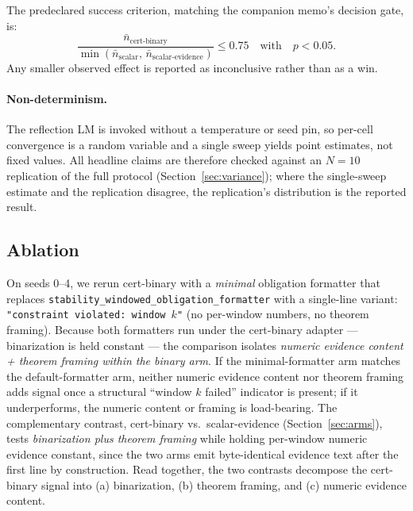 The predeclared success criterion, matching the companion memo's
decision gate, is:
\[
\frac{\bar n_{\text{cert-binary}}}{\min(\bar n_{\text{scalar}},\, \bar n_{\text{scalar-evidence}})} \le 0.75
\quad\text{with}\quad p < 0.05.
\]
Any smaller observed effect is reported as inconclusive rather than
as a win.

\paragraph{Non-determinism.}  The reflection LM is invoked without a
temperature or seed pin, so per-cell convergence is a random
variable and a single sweep yields point estimates, not fixed
values.  All headline claims are therefore checked against an $N=10$
replication of the full protocol
(Section~\ref{sec:variance}); where the single-sweep estimate and
the replication disagree, the replication's distribution is the
reported result.

\subsection{Ablation}\label{sec:ablation}

On seeds 0--4, we rerun cert-binary with a \emph{minimal} obligation
formatter that replaces
\texttt{stability\_windowed\_obligation\_formatter} with a
single-line variant: \texttt{"constraint violated: window $k$"} (no
per-window numbers, no theorem framing).  Because both formatters
run under the cert-binary adapter --- binarization is held constant
--- the comparison isolates \emph{numeric evidence content +
theorem framing within the binary arm}.  If the minimal-formatter
arm matches the default-formatter arm, neither numeric evidence
content nor theorem framing adds signal once a structural
``window $k$ failed'' indicator is present; if it underperforms,
the numeric content or framing is load-bearing.  The
complementary contrast, cert-binary vs.\ scalar-evidence
(Section~\ref{sec:arms}), tests \emph{binarization plus theorem
framing} while holding per-window numeric evidence constant, since
the two arms emit byte-identical evidence text after the first
line by construction.  Read together, the two contrasts decompose
the cert-binary signal into (a) binarization, (b) theorem framing,
and (c) numeric evidence content.
